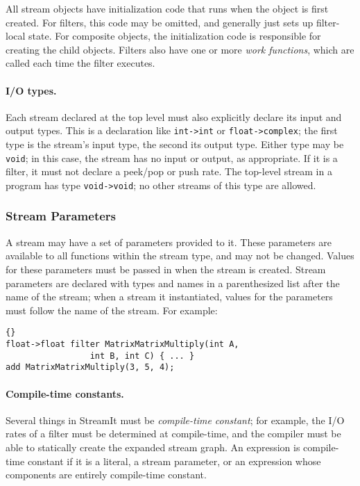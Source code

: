 \documentclass[11pt]{article}
\begin{document}
All stream objects have initialization code that runs when the object
is first created.  For filters, this code may be omitted, and
generally just sets up filter-local state.  For composite objects, the
initialization code is responsible for creating the child objects.
Filters also have one or more \emph{work functions}, which are called
each time the filter executes.

\paragraph{I/O types.}  Each stream declared at the top level must
also explicitly declare its input and output types.  This is a
declaration like \lstinline|int->int| or \lstinline|float->complex|; the first
type is the stream's input type, the second its output type.  Either
type may be \lstinline|void|; in this case, the stream has no input or
output, as appropriate.  If it is a filter, it must not declare a
peek/pop or push rate.  The top-level stream in a program has type
\lstinline|void->void|; no other streams of this type are allowed.

\subsubsection{Stream Parameters}

A stream may have a set of parameters provided to it.  These
parameters are available to all functions within the stream type, and
may not be changed.  Values for these parameters must be passed in
when the stream is created.  Stream parameters are declared with types
and names in a parenthesized list after the name of the stream; when a
stream it instantiated, values for the parameters must follow the name
of the stream.  For example:

\begin{lstlisting}{}
float->float filter MatrixMatrixMultiply(int A,
                 int B, int C) { ... }
add MatrixMatrixMultiply(3, 5, 4);
\end{lstlisting}

\paragraph{Compile-time constants.}  Several things in StreamIt must
be \emph{compile-time constant}; for example, the I/O rates of a
filter must be determined at compile-time, and the compiler must be
able to statically create the expanded stream graph.  An expression is
compile-time constant if it is a literal, a stream parameter, or an
expression whose components are entirely compile-time constant.
\end{document}
